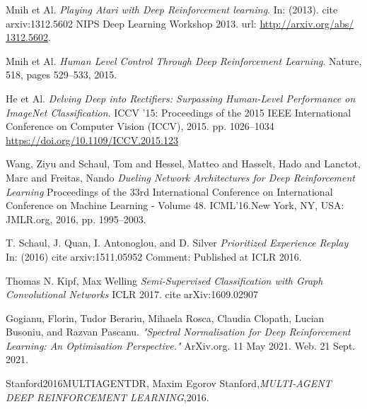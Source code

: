 \documentclass[a4paper,14pt]{extreport}
\begin{document}
\begin{thebibliography}{9}

	
	Mnih et Al.
	\textit{Playing Atari with Deep Reinforcement learning}. 
	In: (2013). cite arxiv:1312.5602 
	NIPS Deep Learning Workshop 2013. url: \url{http://arxiv.org/abs/
	1312.5602}.
	
	Mnih et Al.
	\textit{Human Level Control Through Deep Reinforcement Learning}. 
	Nature, 518, pages 529–533, 2015.

	He et Al.
	\textit{Delving Deep into Rectifiers: Surpassing Human-Level Performance on ImageNet Classification}. 
	 ICCV '15: Proceedings of the 2015 IEEE International Conference on Computer Vision (ICCV), 2015.
	 pp. 1026–1034 \url{https://doi.org/10.1109/ICCV.2015.123}
	 
	 Wang, Ziyu and Schaul, Tom and Hessel, Matteo and Hasselt, Hado and Lanctot, Marc and Freitas, Nando
	 \textit{Dueling Network Architectures for Deep Reinforcement Learning}
	 Proceedings of the 33rd International Conference on International Conference on Machine Learning - Volume 48.
	 ICML’16.New York, NY, USA: JMLR.org, 2016, pp. 1995–2003.
	 
	 T. Schaul, J. Quan, I. Antonoglou, and D. Silver
	 \textit{Prioritized Experience Replay}
	 In: (2016) cite arxiv:1511.05952
	 Comment: Published at ICLR 2016.
	 
	 Thomas N. Kipf, Max Welling
	 \textit{Semi-Supervised Classification with Graph Convolutional Networks}
	 ICLR 2017. cite arXiv:1609.02907

	Gogianu, Florin, Tudor Berariu, Mihaela Rosca, Claudia Clopath, Lucian Busoniu, and Razvan Pascanu. \textit{"Spectral Normalisation for Deep Reinforcement Learning: An Optimisation Perspective."} ArXiv.org. 11 May 2021. Web. 21 Sept. 2021.
	
	Stanford2016MULTIAGENTDR,
	Maxim Egorov Stanford,\textit{MULTI-AGENT DEEP REINFORCEMENT LEARNING},2016.
	


\end{thebibliography}
\end{document}
